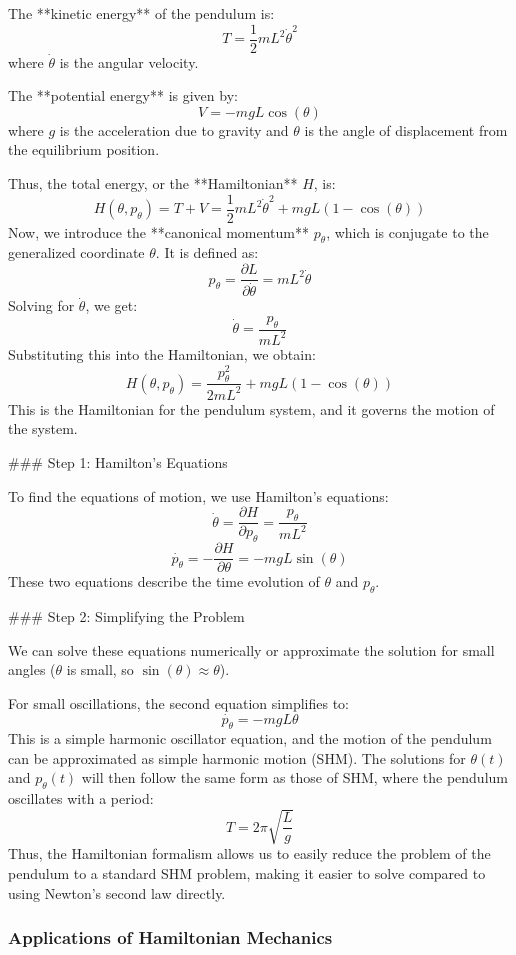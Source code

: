 \documentclass{article}
\begin{document}
The **kinetic energy** of the pendulum is:
\[
T = \frac{1}{2} m L^2 \dot{\theta}^2
\]
where \( \dot{\theta} \) is the angular velocity.

The **potential energy** is given by:
\[
V = -mgL \cos(\theta)
\]
where \( g \) is the acceleration due to gravity and \( \theta \) is the angle of displacement from the equilibrium position.

Thus, the total energy, or the **Hamiltonian** \( H \), is:
\[
H(\theta, p_\theta) = T + V = \frac{1}{2} m L^2 \dot{\theta}^2 + mgL (1 - \cos(\theta))
\]
Now, we introduce the **canonical momentum** \( p_\theta \), which is conjugate to the generalized coordinate \( \theta \). It is defined as:
\[
p_\theta = \frac{\partial L}{\partial \dot{\theta}} = m L^2 \dot{\theta}
\]
Solving for \( \dot{\theta} \), we get:
\[
\dot{\theta} = \frac{p_\theta}{mL^2}
\]
Substituting this into the Hamiltonian, we obtain:
\[
H(\theta, p_\theta) = \frac{p_\theta^2}{2mL^2} + mgL (1 - \cos(\theta))
\]
This is the Hamiltonian for the pendulum system, and it governs the motion of the system.

### Step 1: Hamilton's Equations

To find the equations of motion, we use Hamilton's equations:
\[
\dot{\theta} = \frac{\partial H}{\partial p_\theta} = \frac{p_\theta}{mL^2}
\]
\[
\dot{p_\theta} = -\frac{\partial H}{\partial \theta} = -mgL \sin(\theta)
\]
These two equations describe the time evolution of \( \theta \) and \( p_\theta \).

### Step 2: Simplifying the Problem

We can solve these equations numerically or approximate the solution for small angles (\( \theta \) is small, so \( \sin(\theta) \approx \theta \)).

For small oscillations, the second equation simplifies to:
\[
\dot{p_\theta} = -mgL \theta
\]
This is a simple harmonic oscillator equation, and the motion of the pendulum can be approximated as simple harmonic motion (SHM). The solutions for \( \theta(t) \) and \( p_\theta(t) \) will then follow the same form as those of SHM, where the pendulum oscillates with a period:
\[
T = 2\pi \sqrt{\frac{L}{g}}
\]
Thus, the Hamiltonian formalism allows us to easily reduce the problem of the pendulum to a standard SHM problem, making it easier to solve compared to using Newton's second law directly.

\subsubsection*{Applications of Hamiltonian Mechanics}
\end{document}
